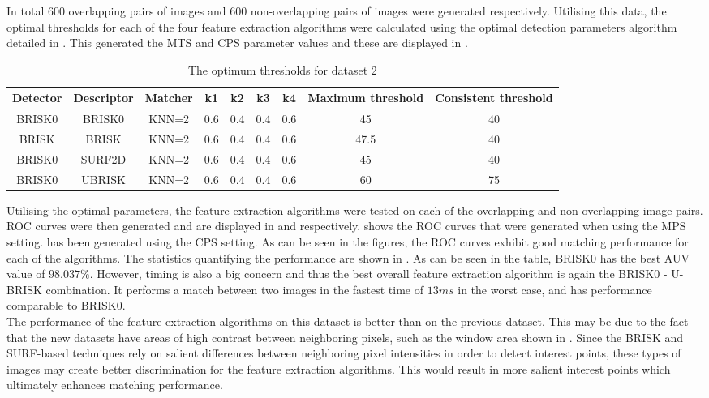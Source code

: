 \documentclass{article}
\begin{document}
In total $600$ overlapping pairs of images and $600$ non-overlapping pairs of images were generated respectively. Utilising this data, the optimal thresholds for each of the four feature extraction algorithms were calculated using the optimal detection parameters algorithm detailed in . This generated the MTS and CPS parameter values and these are displayed in .\\

\begin{table}
\caption{The optimum thresholds for dataset 2}
\begin{tabular}{|c|c|c|c|c|c|c|c|c|}
\hline 
Detector & Descriptor & Matcher & k1 & k2 & k3 & k4 & Maximum threshold & Consistent threshold\tabularnewline
\hline 
\hline 
BRISK0 & BRISK0 & KNN=2 & 0.6 & 0.4 & 0.4 & 0.6 & 45 & 40\tabularnewline
\hline 
BRISK & BRISK & KNN=2 & 0.6 & 0.4 & 0.4 & 0.6 & 47.5 & 40\tabularnewline
\hline 
BRISK0 & SURF2D & KNN=2 & 0.6 & 0.4 & 0.4 & 0.6 & 45 & 40\tabularnewline
\hline 
BRISK0 & UBRISK & KNN=2 & 0.6 & 0.4 & 0.4 & 0.6 & 60 & 75\tabularnewline
\hline 
\end{tabular}
\label{tab:dataset2OptimalThresholds}
\end{table}

Utilising the optimal parameters, the feature extraction algorithms were tested on each of the overlapping and non-overlapping image pairs. ROC curves were then generated and are displayed in  and  respectively.  shows the ROC curves that were generated when using the MPS setting.  has been generated using the CPS setting. As can be seen in the figures, the ROC curves exhibit good matching performance for each of the algorithms. The statistics quantifying the performance are shown in . As can be seen in the table, BRISK0 has the best AUV value of $98.037\%$. However, timing is also a big concern and thus the best overall feature extraction algorithm is again the BRISK0 - U-BRISK combination. It performs a match between two images in the fastest time of $13 ms$ in the worst case, and has performance comparable to BRISK0.\\

The performance of the feature extraction algorithms on this dataset is better than on the previous dataset. This may be due to the fact that the new datasets have areas of high contrast between neighboring pixels, such as the window area shown in . Since the BRISK and SURF-based techniques rely on salient differences between neighboring pixel intensities in order to detect interest points, these types of images may create better discrimination for the feature extraction algorithms. This would result in more salient interest points which ultimately enhances matching performance.\\
\end{document}
